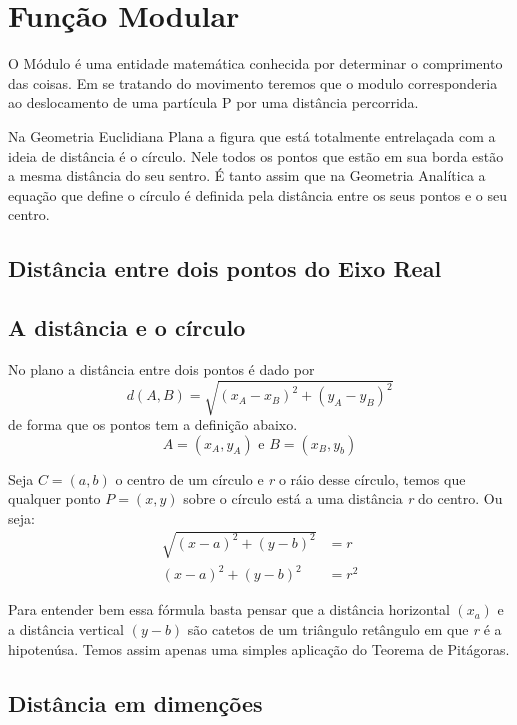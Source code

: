 \chapter{Função Modular}

O Módulo é uma entidade matemática conhecida por determinar o comprimento das coisas. Em se tratando do movimento teremos que o modulo corresponderia ao deslocamento de uma partícula P por uma distância percorrida.

Na Geometria Euclidiana Plana a figura que está totalmente entrelaçada com a ideia de distância é o círculo. Nele todos os pontos que estão em sua borda estão a mesma distância do seu sentro. É tanto assim que na Geometria Analítica a equação que define o círculo é definida pela distância entre os seus pontos e o seu centro.

\section{Distância entre dois pontos do Eixo Real}
\begin{center}
\end{center}

\section{A distância e o círculo}
No plano a distância entre dois pontos é dado por $$d(A,B)=\sqrt{(x_A-x_B)^2+(y_A-y_B)^2}$$
de forma que os pontos tem a definição abaixo.
$$A=(x_A, y_A) \mbox{ e }B=(x_B, y_b)$$

Seja $C=(a,b)$ o centro de um círculo e \textit{r} o ráio desse círculo, temos que qualquer ponto $P=(x,y)$ sobre o círculo está a uma distância \textit{r} do centro. Ou seja:
\begin{align*}
 \sqrt{(x-a)^2+(y-b)^2}&=r\\
 (x-a)^2+(y-b)^2&=r^2
\end{align*}

Para entender bem essa fórmula basta pensar que a distância horizontal $(x_a)$ e a distância vertical $(y-b)$ são catetos de um triângulo retângulo em que \textit{r} é a hipotenúsa. Temos assim apenas uma simples aplicação do Teorema de Pitágoras.

\section{Distância em dimenções}

